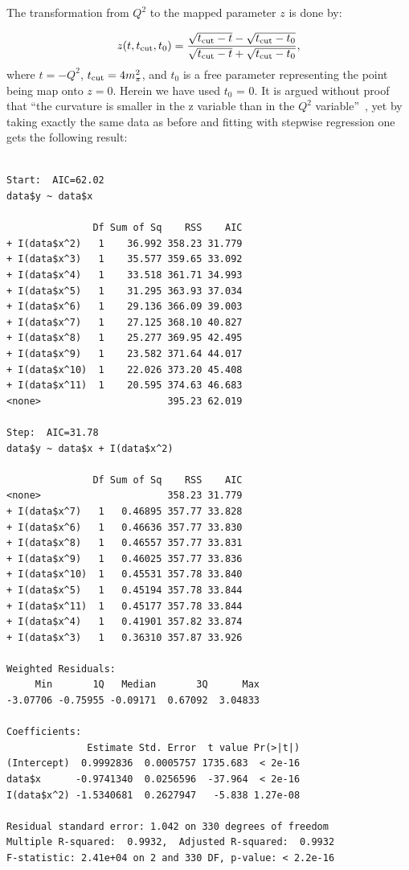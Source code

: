 \documentclass[10pt,superscriptaddress,aps,prc,twocolumn]{revtex4-1}
\begin{document}
\begin{appendix}
The transformation from $Q^2$ to the mapped parameter $z$ is done by:

\begin{equation}
z(t,t_{\rm cut},t_0) = \frac{\sqrt{t_{\rm cut} - t} - \sqrt{t_{\rm cut} - t_0} }{ \sqrt{t_{\rm cut} - t} + \sqrt{t_{\rm cut} - t_0}  },  
\end{equation}
where $t=-Q^2$, $t_{\rm cut} = 4m_\pi^2$, and $t_0$ is a free parameter 
representing the point being map onto $z=0$.   
Herein we have used $t_0$ = 0.  
It is argued without proof that ``the curvature is smaller in the
z variable than in the $Q^2$ variable''~\cite{Hill:2010yb}, yet by taking 
exactly the same data as before and fitting with stepwise regression
one gets the following result:

\begin{Verbatim}[fontsize=\footnotesize]

Start:  AIC=62.02
data$y ~ data$x

               Df Sum of Sq    RSS    AIC
+ I(data$x^2)   1    36.992 358.23 31.779
+ I(data$x^3)   1    35.577 359.65 33.092
+ I(data$x^4)   1    33.518 361.71 34.993
+ I(data$x^5)   1    31.295 363.93 37.034
+ I(data$x^6)   1    29.136 366.09 39.003
+ I(data$x^7)   1    27.125 368.10 40.827
+ I(data$x^8)   1    25.277 369.95 42.495
+ I(data$x^9)   1    23.582 371.64 44.017
+ I(data$x^10)  1    22.026 373.20 45.408
+ I(data$x^11)  1    20.595 374.63 46.683
<none>                      395.23 62.019

Step:  AIC=31.78
data$y ~ data$x + I(data$x^2)

               Df Sum of Sq    RSS    AIC
<none>                      358.23 31.779
+ I(data$x^7)   1   0.46895 357.77 33.828
+ I(data$x^6)   1   0.46636 357.77 33.830
+ I(data$x^8)   1   0.46557 357.77 33.831
+ I(data$x^9)   1   0.46025 357.77 33.836
+ I(data$x^10)  1   0.45531 357.78 33.840
+ I(data$x^5)   1   0.45194 357.78 33.844
+ I(data$x^11)  1   0.45177 357.78 33.844
+ I(data$x^4)   1   0.41901 357.82 33.874
+ I(data$x^3)   1   0.36310 357.87 33.926

Weighted Residuals:
     Min       1Q   Median       3Q      Max
-3.07706 -0.75955 -0.09171  0.67092  3.04833

Coefficients:
              Estimate Std. Error  t value Pr(>|t|)
(Intercept)  0.9992836  0.0005757 1735.683  < 2e-16 
data$x      -0.9741340  0.0256596  -37.964  < 2e-16 
I(data$x^2) -1.5340681  0.2627947   -5.838 1.27e-08 

Residual standard error: 1.042 on 330 degrees of freedom
Multiple R-squared:  0.9932,  Adjusted R-squared:  0.9932
F-statistic: 2.41e+04 on 2 and 330 DF, p-value: < 2.2e-16


\end{Verbatim}
\end{appendix}
\end{document}
